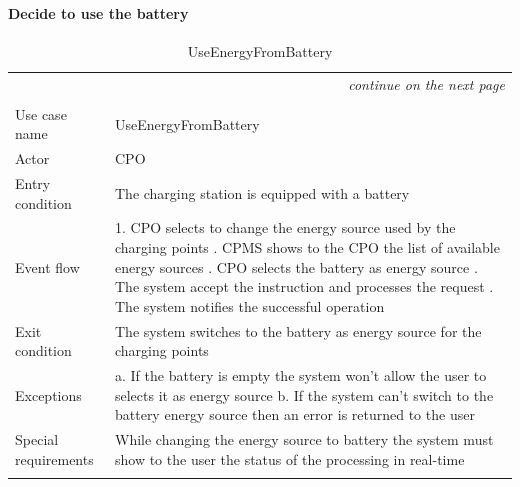 \paragraph{Decide to use the battery}
\begin{center}
    \begin{longtable}{p{4cm} p{11cm}}
    \multicolumn{2}{r}{\itshape{continue on the next page}}\\
    \endfoot 
    \\
    \endlastfoot
    \hline
     Use case name &  UseEnergyFromBattery\\
     \hline
     Actor & CPO \\
     \hline
     Entry condition & The charging station is equipped with a battery \\
     \hline
     Event flow &
        1. CPO selects to change the energy source used by the charging points \newline
        2. CPMS shows to the CPO the list of available energy sources \newline
        3. CPO selects the battery as energy source \newline
        4. The system accept the instruction and processes the request \newline
        5. The system notifies the successful operation
     \\
     \hline
     Exit condition &  The system switches to the battery as energy source for the charging points\\
     \hline
     Exceptions & 
        a. If the battery is empty the system won't allow the user to selects it as energy source \newline
        b. If the system can't switch to the battery energy source then an error is returned to the user\\
     \hline
     Special requirements &
        While changing the energy source to battery the system must show to the user the status of the processing in real-time\\
     \hline
    \caption{UseEnergyFromBattery}
    \label{tab:UseEnergyFromBattery}
    \end{longtable}
\end{center}
\clearpage

